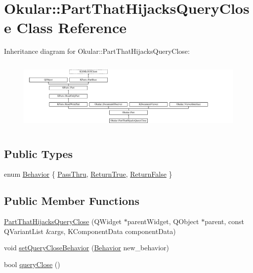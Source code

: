 \hypertarget{classOkular_1_1PartThatHijacksQueryClose}{\section{Okular\+:\+:Part\+That\+Hijacks\+Query\+Close Class Reference}
\label{classOkular_1_1PartThatHijacksQueryClose}
}
Inheritance diagram for Okular\+:\+:Part\+That\+Hijacks\+Query\+Close\+:\begin{figure}[H]
\begin{center}
\leavevmode
\includegraphics[height=3.563636cm]{classOkular_1_1PartThatHijacksQueryClose}
\end{center}
\end{figure}
\subsection*{Public Types}
\begin{DoxyCompactItemize}
\item 
enum \hyperlink{classOkular_1_1PartThatHijacksQueryClose_a0ea34ea89c435d138fc9dae84723cf27}{Behavior} \{ \hyperlink{classOkular_1_1PartThatHijacksQueryClose_a0ea34ea89c435d138fc9dae84723cf27af315c1cdb221a030ff7c67df26a52c97}{Pass\+Thru}, 
\hyperlink{classOkular_1_1PartThatHijacksQueryClose_a0ea34ea89c435d138fc9dae84723cf27a4988d6292e5dcfae0c8f093f43a59748}{Return\+True}, 
\hyperlink{classOkular_1_1PartThatHijacksQueryClose_a0ea34ea89c435d138fc9dae84723cf27a6e0e0f5f0d1eaa981f41fc3dc0b94b45}{Return\+False}
 \}
\end{DoxyCompactItemize}
\subsection*{Public Member Functions}
\begin{DoxyCompactItemize}
\item 
\hyperlink{classOkular_1_1PartThatHijacksQueryClose_ac695257602f560cbe78c64527119efc9}{Part\+That\+Hijacks\+Query\+Close} (Q\+Widget $\ast$parent\+Widget, Q\+Object $\ast$parent, const Q\+Variant\+List \&args, K\+Component\+Data component\+Data)
\item 
void \hyperlink{classOkular_1_1PartThatHijacksQueryClose_ae63d09c1b00c0929791c3c17448ede3d}{set\+Query\+Close\+Behavior} (\hyperlink{classOkular_1_1PartThatHijacksQueryClose_a0ea34ea89c435d138fc9dae84723cf27}{Behavior} new\+\_\+behavior)
\item 
bool \hyperlink{classOkular_1_1PartThatHijacksQueryClose_acfbda56186d6f962dc8c9aa48eb935a8}{query\+Close} ()
\end{DoxyCompactItemize}
